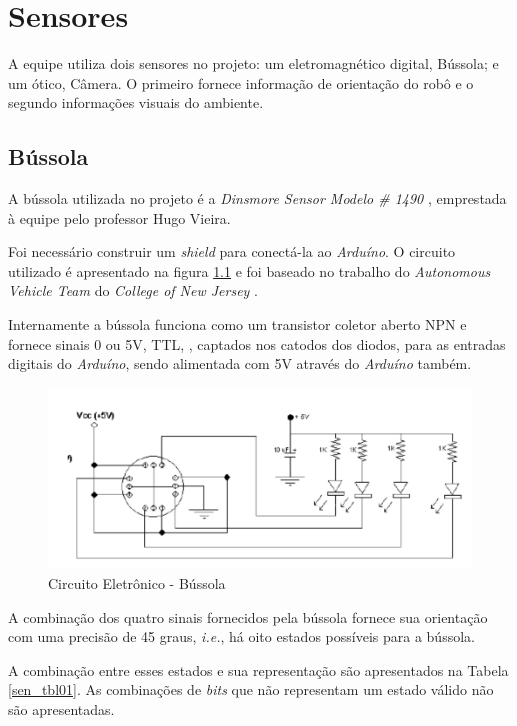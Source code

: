 \chapter{Sensores}
\label{sec_sensores}

A equipe utiliza dois sensores no projeto: um eletromagnético digital, Bússola; e um ótico, Câmera. O primeiro fornece informação de orientação do robô e o segundo informações visuais do ambiente.

\section{Bússola}
\label{sec_bussola}

A bússola utilizada no projeto é a \textit{Dinsmore Sensor Modelo \# 1490} \cite{bussola}, emprestada à equipe pelo professor Hugo Vieira.

Foi necessário construir um \textit{shield} para conectá-la ao \textit{Arduíno}. O circuito utilizado é apresentado na figura \ref{sen_fig01} e foi baseado no trabalho do \textit{Autonomous Vehicle Team} do \textit{College of New Jersey} \cite{newjersey}.

Internamente a bússola funciona como um transistor coletor aberto NPN e fornece sinais 0 ou 5V, TTL, \cite{bussola}, captados nos catodos dos diodos, para as entradas digitais do \textit{Arduíno}, sendo alimentada com 5V através do \textit{Arduíno} também.

\begin{figure}[h!]
    \center
    \includegraphics[scale=0.4]{imagens/circuito_bussola.png}
    \caption{Circuito Eletrônico - Bússola}
    \label{sen_fig01}
\end{figure}

A combinação dos quatro sinais fornecidos pela bússola fornece sua orientação com uma precisão de 45 graus, \textit{i.e.}, há oito estados possíveis para a bússola. 

A combinação entre esses estados e sua representação são apresentados na Tabela \ref{sen_tbl01}. As combinações de \textit{bits} que não representam um estado válido não são apresentadas.

